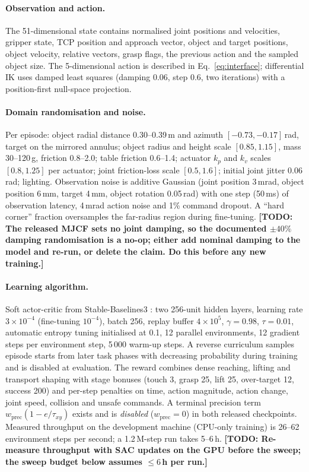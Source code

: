 \documentclass{article}
\newcommand{\todo}[1]{{\color{red}\textbf{[TODO: #1]}}}
\begin{document}
\paragraph{Observation and action.}
The 51-dimensional state contains normalised joint positions and velocities, gripper state, TCP position and approach vector, object and target positions, object velocity, relative vectors, grasp flags, the previous action and the sampled object size. The 5-dimensional action is described in Eq.~\ref{eq:interface}; differential IK uses damped least squares (damping 0.06, step 0.6, two iterations) with a position-first null-space projection.

\paragraph{Domain randomisation and noise.}
Per episode: object radial distance 0.30--0.39\,m and azimuth $[-0.73,-0.17]$\,rad, target on the mirrored annulus; object radius and height scale $[0.85,1.15]$, mass 30--120\,g, friction 0.8--2.0; table friction 0.6--1.4; actuator $k_p$ and $k_v$ scales $[0.8,1.25]$ per actuator; joint friction-loss scale $[0.5,1.6]$; initial joint jitter 0.06\,rad; lighting. Observation noise is additive Gaussian (joint position 3\,mrad, object position 6\,mm, target 4\,mm, object rotation 0.05\,rad) with one step (50\,ms) of observation latency, 4\,mrad action noise and 1\% command dropout. A ``hard corner'' fraction oversamples the far-radius region during fine-tuning. \todo{The released MJCF sets no joint damping, so the documented $\pm40\%$ damping randomisation is a no-op; either add nominal damping to the model and re-run, or delete the claim. Do this before any new training.}

\paragraph{Learning algorithm.}
Soft actor-critic \citep{haarnoja2018sac} from Stable-Baselines3 \citep{raffin2021sb3}: two 256-unit hidden layers, learning rate $3{\times}10^{-4}$ (fine-tuning $10^{-4}$), batch 256, replay buffer $4{\times}10^5$, $\gamma{=}0.98$, $\tau{=}0.01$, automatic entropy tuning initialised at 0.1, 12 parallel environments, 12 gradient steps per environment step, 5\,000 warm-up steps. A reverse curriculum samples episode starts from later task phases with decreasing probability during training and is disabled at evaluation. The reward combines dense reaching, lifting and transport shaping with stage bonuses (touch 3, grasp 25, lift 25, over-target 12, success 200) and per-step penalties on time, action magnitude, action change, joint speed, collision and unsafe commands. A terminal precision term $w_{\mathrm{prec}}(1 - e/\tau_{xy})$ exists and is \emph{disabled} ($w_{\mathrm{prec}}{=}0$) in both released checkpoints. Measured throughput on the development machine (CPU-only training) is 26--62 environment steps per second; a 1.2\,M-step run takes 5--6\,h. \todo{Re-measure throughput with SAC updates on the GPU before the sweep; the sweep budget below assumes $\le 6$\,h per run.}
\end{document}
